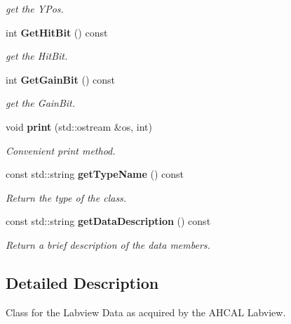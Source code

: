 \begin{DoxyCompactItemize}
\begin{DoxyCompactList}\small\item\em get the Y\-Pos. \end{DoxyCompactList}\item 
int {\bf Get\-Hit\-Bit} () const \label{classCALICE_1_1LabviewBlock_abcf1f2fcce69be90c406ac96d2a960df}

\begin{DoxyCompactList}\small\item\em get the Hit\-Bit. \end{DoxyCompactList}\item 
int {\bf Get\-Gain\-Bit} () const \label{classCALICE_1_1LabviewBlock_adc2f3d040d21a1988569a6e4dd383f2e}

\begin{DoxyCompactList}\small\item\em get the Gain\-Bit. \end{DoxyCompactList}\item 
void {\bf print} (std\-::ostream \&os, int)\label{classCALICE_1_1LabviewBlock_ad1ac4cf349c76f815a0e0514aec496d6}

\begin{DoxyCompactList}\small\item\em Convenient print method. \end{DoxyCompactList}\item 
const std\-::string {\bf get\-Type\-Name} () const \label{classCALICE_1_1LabviewBlock_ad5cfc916c66f1211bcf189237473eba6}

\begin{DoxyCompactList}\small\item\em Return the type of the class. \end{DoxyCompactList}\item 
const std\-::string {\bf get\-Data\-Description} () const \label{classCALICE_1_1LabviewBlock_a569668ec05207ba78574d45acce7e93a}

\begin{DoxyCompactList}\small\item\em Return a brief description of the data members. \end{DoxyCompactList}\end{DoxyCompactItemize}


\subsection{Detailed Description}
Class for the Labview Data as acquired by the A\-H\-C\-A\-L Labview. 

